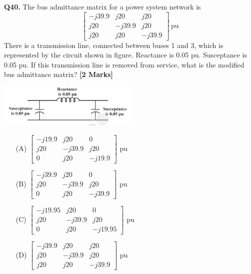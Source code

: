 \documentclass[11pt]{article}
\newcommand{\questionb}[2]{
    \noindent\textbf{Q#2.} #1 \hfill \textbf{[2 Marks]}
}
\begin{document}
\questionb{The bus admittance matrix for a power system network is \\
\[
\begin{bmatrix}
-j39.9 & j20 & j20 \\
j20 & -j39.9 & j20 \\
j20 & j20 & -j39.9
\end{bmatrix} \, \text{pu}
\] 
There is a transmission line, connected between buses 1 and 3, which is represented by the circuit shown in figure. Reactance is 0.05 pu. Susceptance is 0.05 pu. If this transmission line is removed from service, what is the modified bus admittance matrix?}{40}
\begin{center}
\includegraphics[width=0.5\textwidth]{figures/40.png}
\end{center}
\begin{enumerate}
    \item[(A)] 
    \(
    \begin{bmatrix}
    -j19.9 & j20 & 0 \\
    j20 & -j39.9 & j20 \\
    0 & j20 & -j19.9
    \end{bmatrix}
    \) pu  
    \item[(B)] 
    \(
    \begin{bmatrix}
    -j39.9 & j20 & 0 \\
    j20 & -j39.9 & j20 \\
    0 & j20 & -j39.9
    \end{bmatrix}
    \) pu  
    \item[(C)] 
    \(
    \begin{bmatrix}
    -j19.95 & j20 & 0 \\
    j20 & -j39.9 & j20 \\
    0 & j20 & -j19.95
    \end{bmatrix}
    \) pu  
    \item[(D)] 
    \(
    \begin{bmatrix}
    -j39.9 & j20 & j20 \\
    j20 & -j39.9 & j20 \\
    j20 & j20 & -j39.9
    \end{bmatrix}
    \) pu  
\end{enumerate}
\vspace{0.5cm}
\end{document}
